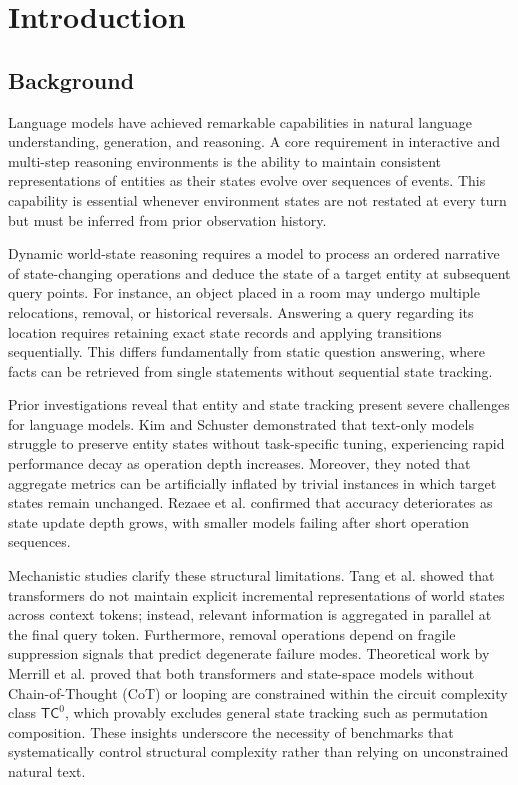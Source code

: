 \documentclass{iutbscthesis}
\begin{document}
\chapter{Introduction}

\section{Background}
Language models have achieved remarkable capabilities in natural language understanding, generation, and reasoning. A core requirement in interactive and multi-step reasoning environments is the ability to maintain consistent representations of entities as their states evolve over sequences of events. This capability is essential whenever environment states are not restated at every turn but must be inferred from prior observation history.

Dynamic world-state reasoning requires a model to process an ordered narrative of state-changing operations and deduce the state of a target entity at subsequent query points. For instance, an object placed in a room may undergo multiple relocations, removal, or historical reversals. Answering a query regarding its location requires retaining exact state records and applying transitions sequentially. This differs fundamentally from static question answering, where facts can be retrieved from single statements without sequential state tracking.

Prior investigations reveal that entity and state tracking present severe challenges for language models. Kim and Schuster \cite{kim2023entity} demonstrated that text-only models struggle to preserve entity states without task-specific tuning, experiencing rapid performance decay as operation depth increases. Moreover, they noted that aggregate metrics can be artificially inflated by trivial instances in which target states remain unchanged. Rezaee et al. \cite{rezaee2025exploring} confirmed that accuracy deteriorates as state update depth grows, with smaller models failing after short operation sequences.

Mechanistic studies clarify these structural limitations. Tang et al. \cite{tang2026track} showed that transformers do not maintain explicit incremental representations of world states across context tokens; instead, relevant information is aggregated in parallel at the final query token. Furthermore, removal operations depend on fragile suppression signals that predict degenerate failure modes. Theoretical work by Merrill et al. \cite{merrill2024illusion} proved that both transformers and state-space models without Chain-of-Thought (CoT) or looping are constrained within the circuit complexity class $\mathsf{TC}^0$, which provably excludes general state tracking such as permutation composition. These insights underscore the necessity of benchmarks that systematically control structural complexity rather than relying on unconstrained natural text.
\end{document}
